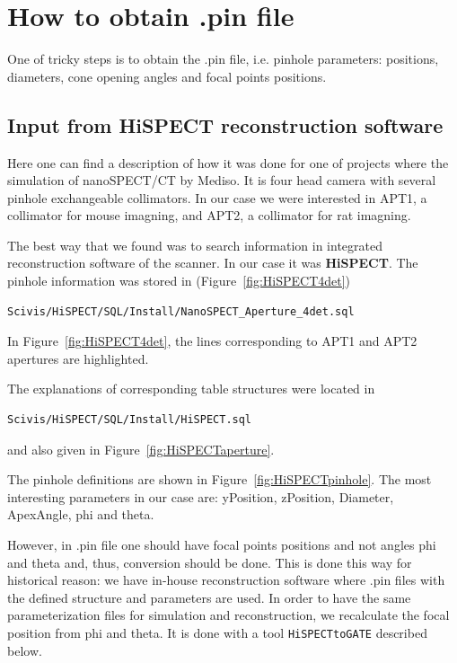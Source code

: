 \documentclass[12pt]{article}
\begin{document}
\section{How to obtain .pin file}
One of tricky steps is to obtain the .pin file, i.e. pinhole parameters: positions, diameters, cone opening angles and focal points positions. 

\subsection{Input from HiSPECT reconstruction software}
Here one can find a description of how it was done for one of projects where the simulation of nanoSPECT/CT by Mediso. It is four head camera with several pinhole exchangeable collimators. In our case we were interested in APT1, a collimator for mouse imagning, and APT2, a collimator for rat imagning. 

The best way that we found was to search information in integrated reconstruction software of the scanner. In our case it was \textbf{HiSPECT}.
The pinhole information was stored in (Figure~\ref{fig:HiSPECT4det})
\begin{verbatim}
Scivis/HiSPECT/SQL/Install/NanoSPECT_Aperture_4det.sql
\end{verbatim}
In Figure~\ref{fig:HiSPECT4det}, the lines corresponding to APT1 and APT2 apertures are highlighted.

The explanations of corresponding table structures were located in 
\begin{verbatim}
Scivis/HiSPECT/SQL/Install/HiSPECT.sql
\end{verbatim}
and also given in Figure~\ref{fig:HiSPECTaperture}.

The pinhole definitions are shown in Figure~\ref{fig:HiSPECTpinhole}. The most interesting parameters in our case are: yPosition, zPosition, Diameter, ApexAngle, phi and theta.

However, in .pin file one should have focal points positions and not angles phi and theta and, thus, conversion should be done. This is done this way for historical reason: we have in-house reconstruction software where .pin files with the defined structure and parameters are used. In order to have the same parameterization files for simulation and reconstruction, we recalculate the focal position from phi and theta. It is done with a tool \texttt{HiSPECTtoGATE} described below.
\end{document}

